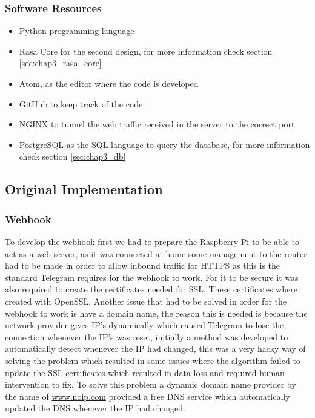 \subsubsection{Software Resources}\label{sec:chap4_res_back}

\begin{itemize}
	\item {Python programming language}
	\item {Rasa Core for the second design, for more information check section \ref{sec:chap3_rasa_core}}
	\item {Atom, as the editor where the code is developed}
	\item {GitHub to keep track of the code}
	\item {NGINX to tunnel the web traffic received in the server to the correct port}
	\item {PostgreSQL as the SQL language to query the database, for more information check section \ref{sec:chap3_db}}
\end{itemize}

\subsection{Original Implementation}\label{sec:chap4_ori_imp}
\subsubsection{Webhook}\label{sec:chap4_ori_imp_web}

To develop the webhook first we had to prepare the Raspberry Pi to be able to act as a web server, as it was connected at home some management to the router had to be made in order to allow inbound traffic for HTTPS as this is the standard Telegram requires for the webhook to work. For it to be secure it was also required to create the certificates needed for SSL. These certificates where created with OpenSSL. Another issue that had to be solved in order for the webhook to work is have a domain name, the reason this is needed is because the network provider gives IP’s dynamically which caused Telegram to lose the connection whenever the IP’s was reset, initially a method was developed to automatically detect whenever the IP had changed, this was a very hacky way of solving the problem which resulted in some issues where the algorithm failed to update the SSL certificates which resulted in data loss and required human intervention to fix. To solve this problem a dynamic domain name provider by the name of \url{www.noip.com} provided a free DNS service which automatically updated the DNS whenever the IP had changed.\\

